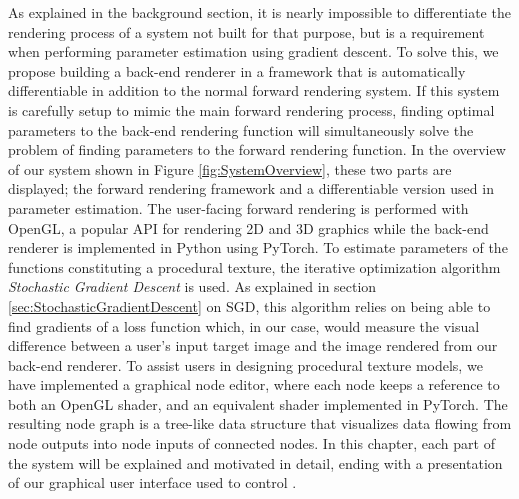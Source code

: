 As explained in the background section, it is nearly impossible to differentiate the rendering process of a system not built for that purpose, but is a requirement when performing parameter estimation using gradient descent. To solve this, we propose building a back-end renderer in a framework that is automatically differentiable in addition to the normal forward rendering system. If this system is carefully setup to mimic the main forward rendering process, finding optimal parameters to the back-end rendering function will simultaneously solve the problem of finding parameters to the forward rendering function. In the overview of our system shown in Figure \ref{fig:SystemOverview}, these two parts are displayed; the forward rendering framework and a differentiable version used in parameter estimation. The user-facing forward rendering is performed with OpenGL, a popular API for rendering 2D and 3D graphics while the back-end renderer is implemented in Python using PyTorch. To estimate parameters of the functions constituting a procedural texture, the iterative optimization algorithm \textit{Stochastic Gradient Descent} is used. As explained in section \ref{sec:StochasticGradientDescent} on SGD, this algorithm relies on being able to find gradients of a loss function which, in our case, would measure the visual difference between a user's input target image and the image rendered from our back-end renderer. To assist users in designing procedural texture models, we have implemented a graphical node editor, where each node keeps a reference to both an OpenGL shader, and an equivalent shader implemented in PyTorch. The resulting node graph is a tree-like data structure that visualizes data flowing from node outputs into node inputs of connected nodes. In this chapter, each part of the system will be explained and motivated in detail, ending with a presentation of our graphical user interface used to control \dipter{}.

